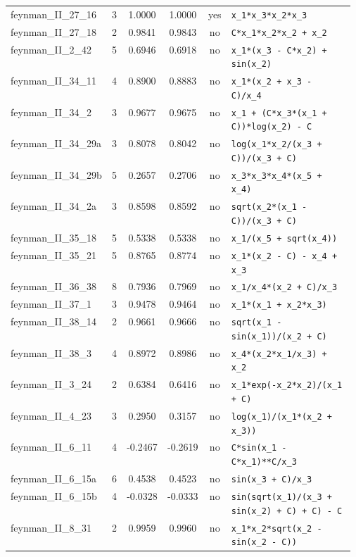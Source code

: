 \begin{footnotesize}
\begin{longtable}{p{0.215\linewidth} c c c c p{0.36\linewidth}}
feynman\_II\_27\_16 & 3 & 1.0000 & 1.0000 & yes & \texttt{x\_1*x\_3*x\_2*x\_3} \\
feynman\_II\_27\_18 & 2 & 0.9841 & 0.9843 & no & \texttt{C*x\_1*x\_2*x\_2 + x\_2} \\
feynman\_II\_2\_42 & 5 & 0.6946 & 0.6918 & no & \texttt{x\_1*(x\_3 - C*x\_2) + sin(x\_2)} \\
feynman\_II\_34\_11 & 4 & 0.8900 & 0.8883 & no & \texttt{x\_1*(x\_2 + x\_3 - C)/x\_4} \\
feynman\_II\_34\_2 & 3 & 0.9677 & 0.9675 & no & \texttt{x\_1 + (C*x\_3*(x\_1 + C))*log(x\_2) - C} \\
feynman\_II\_34\_29a & 3 & 0.8078 & 0.8042 & no & \texttt{log(x\_1*x\_2/(x\_3 + C))/(x\_3 + C)} \\
feynman\_II\_34\_29b & 5 & 0.2657 & 0.2706 & no & \texttt{x\_3*x\_3*x\_4*(x\_5 + x\_4)} \\
feynman\_II\_34\_2a & 3 & 0.8598 & 0.8592 & no & \texttt{sqrt(x\_2*(x\_1 - C))/(x\_3 + C)} \\
feynman\_II\_35\_18 & 5 & 0.5338 & 0.5338 & no & \texttt{x\_1/(x\_5 + sqrt(x\_4))} \\
feynman\_II\_35\_21 & 5 & 0.8765 & 0.8774 & no & \texttt{x\_1*(x\_2 - C) - x\_4 + x\_3} \\
feynman\_II\_36\_38 & 8 & 0.7936 & 0.7969 & no & \texttt{x\_1/x\_4*(x\_2 + C)/x\_3} \\
feynman\_II\_37\_1 & 3 & 0.9478 & 0.9464 & no & \texttt{x\_1*(x\_1 + x\_2*x\_3)} \\
feynman\_II\_38\_14 & 2 & 0.9661 & 0.9666 & no & \texttt{sqrt(x\_1 - sin(x\_1))/(x\_2 + C)} \\
feynman\_II\_38\_3 & 4 & 0.8972 & 0.8986 & no & \texttt{x\_4*(x\_2*x\_1/x\_3) + x\_2} \\
feynman\_II\_3\_24 & 2 & 0.6384 & 0.6416 & no & \texttt{x\_1*exp(-x\_2*x\_2)/(x\_1 + C)} \\
feynman\_II\_4\_23 & 3 & 0.2950 & 0.3157 & no & \texttt{log(x\_1)/(x\_1*(x\_2 + x\_3))} \\
feynman\_II\_6\_11 & 4 & -0.2467 & -0.2619 & no & \texttt{C*sin(x\_1 - C*x\_1)**C/x\_3} \\
feynman\_II\_6\_15a & 6 & 0.4538 & 0.4523 & no & \texttt{sin(x\_3 + C)/x\_3} \\
feynman\_II\_6\_15b & 4 & -0.0328 & -0.0333 & no & \texttt{sin(sqrt(x\_1)/(x\_3 + sin(x\_2) + C) + C) - C} \\
feynman\_II\_8\_31 & 2 & 0.9959 & 0.9960 & no & \texttt{x\_1*x\_2*sqrt(x\_2 - sin(x\_2 - C))} \\

\end{longtable}
\end{footnotesize}
